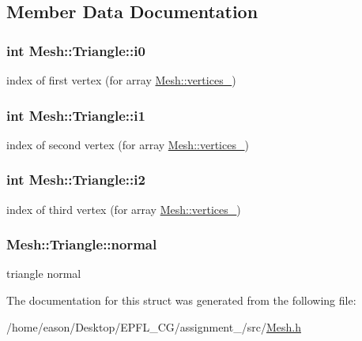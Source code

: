 \subsection{Member Data Documentation}
\subsubsection[{\texorpdfstring{i0}{i0}}]{\setlength{\rightskip}{0pt plus 5cm}int Mesh\+::\+Triangle\+::i0}\hypertarget{structMesh_1_1Triangle_a6a61f7ea00034397eed1adcf0fae1790}{}\label{structMesh_1_1Triangle_a6a61f7ea00034397eed1adcf0fae1790}


index of first vertex (for array \hyperlink{classMesh_a986edf1ab1d37e517ff8adc928519528}{Mesh\+::vertices\+\_\+}) 

\subsubsection[{\texorpdfstring{i1}{i1}}]{\setlength{\rightskip}{0pt plus 5cm}int Mesh\+::\+Triangle\+::i1}\hypertarget{structMesh_1_1Triangle_afc583a0169089f8a73367a31cec7bc39}{}\label{structMesh_1_1Triangle_afc583a0169089f8a73367a31cec7bc39}


index of second vertex (for array \hyperlink{classMesh_a986edf1ab1d37e517ff8adc928519528}{Mesh\+::vertices\+\_\+}) 

\subsubsection[{\texorpdfstring{i2}{i2}}]{\setlength{\rightskip}{0pt plus 5cm}int Mesh\+::\+Triangle\+::i2}\hypertarget{structMesh_1_1Triangle_ae123132ba821ea91e4a9fb12349bd4ea}{}\label{structMesh_1_1Triangle_ae123132ba821ea91e4a9fb12349bd4ea}


index of third vertex (for array \hyperlink{classMesh_a986edf1ab1d37e517ff8adc928519528}{Mesh\+::vertices\+\_\+}) 

\subsubsection[{\texorpdfstring{normal}{normal}}]{ Mesh\+::\+Triangle\+::normal}\hypertarget{structMesh_1_1Triangle_a697c3d7e2f4a316e7b486e048efff56d}{}\label{structMesh_1_1Triangle_a697c3d7e2f4a316e7b486e048efff56d}


triangle normal 



The documentation for this struct was generated from the following file\+:\begin{DoxyCompactItemize}
\item 
/home/eason/\+Desktop/\+E\+P\+F\+L\+\_\+\+C\+G/assignment\+\_/src/\hyperlink{Mesh_8h}{Mesh.\+h}\end{DoxyCompactItemize}
